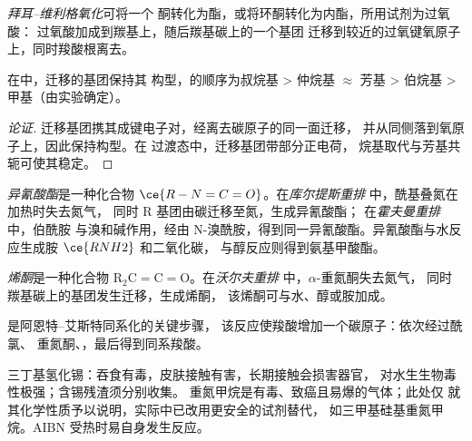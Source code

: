 \begin{definition}[拜耳–维利格氧化]\label{def:b3:radicals-carbenes:baeyer}
\emph{拜耳–维利格氧化}可将一个
酮转化为酯，或将环酮转化为内酯，所用试剂为过氧酸：
过氧酸加成到羰基上，随后羰基碳上的一个基团
迁移到较近的过氧键氧原子上，同时羧酸根离去。
\end{definition}

\begin{proposition}[拜耳–维利格区域化学]\label{prop:b3:radicals-carbenes:bv-retention}
在中，迁移的基团保持其
构型，的顺序为叔烷基 >
仲烷基 $\approx$ 芳基 > 伯烷基 > 甲基（由实验确定）。
\end{proposition}

\begin{proof}[论证]
迁移基团携其成键电子对，经离去碳原子的同一面迁移，
并从同侧落到氧原子上，因此保持构型。在
过渡态中，迁移基团带部分正电荷，
烷基取代与芳基共轭可使其稳定。
\end{proof}

\begin{definition}\label{def:b3:radicals-carbenes:curtius}
\emph{异氰酸酯}是一种化合物 $\ce{R-N=C=O}$。在\emph{库尔提斯重排}
中，酰基叠氮在加热时失去氮气，
同时 R 基团由碳迁移至氮，生成异氰酸酯；
在\emph{霍夫曼重排}中，伯酰胺
与溴和碱作用，经由
N-溴酰胺，得到同一异氰酸酯。异氰酸酯与水反应生成胺 $\ce{RNH2}$ 和二氧化碳，
与醇反应则得到氨基甲酸酯。
\end{definition}

\begin{definition}[烯酮与沃尔夫重排]\label{def:b3:radicals-carbenes:wolff}
\emph{烯酮}是一种化合物 $\mathrm{R_2C{=}C{=}O}$。在\emph{沃尔夫重排}
中，$\alpha$-重氮酮失去氮气，
同时羰基碳上的基团发生迁移，生成烯酮，
该烯酮可与水、醇或胺加成。
\end{definition}

是阿恩特–艾斯特同系化的关键步骤，
该反应使羧酸增加一个碳原子：依次经过酰氯、
重氮酮、，最后得到同系羧酸。

\begin{safety}{}
三丁基氢化锡：吞食有毒，皮肤接触有害，长期接触会损害器官，
对水生生物毒性极强；含锡残渣须分别收集。
重氮甲烷是有毒、致癌且易爆的气体；此处仅
就其化学性质予以说明，实际中已改用更安全的试剂替代，
如三甲基硅基重氮甲烷。AIBN 受热时易自身发生反应。
\end{safety}

